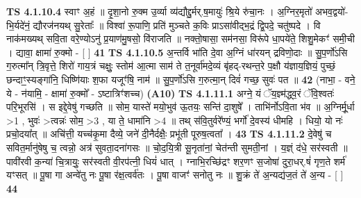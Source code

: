 \documentclass[17pt]{extarticle}
\begin{document}
                  \newline
                                \textbf{ TS 4.1.10.4} \newline
                  स्वाꣳ अ॒हं ॥ दृ॒शा॒नो रु॒क्म उ॒र्व्या व्य॑द्यौद्दु॒र्मर्.ष॒मायुः॑ श्रि॒ये रु॑चा॒नः । अ॒ग्निर॒मृतो॑ अभव॒द्वयो॑-भि॒र्यदे॑नं॒ द्यौरज॑नयथ् सु॒रेताः᳚ ॥ विश्वा॑ रू॒पाणि॒ प्रति॑ मुञ्चते क॒विः प्राऽसा॑वीद्भ॒द्रं द्वि॒पदे॒ चतु॑ष्पदे । वि नाक॑मख्यथ् सवि॒ता वरे॒ण्योऽनु॑ प्र॒याण॑मु॒षसो॒ वि॑राजति ॥ नक्तो॒षासा॒ सम॑नसा॒ विरू॑पे धा॒पये॑ते॒ शिशु॒मेकꣳ॑ समी॒ची । द्यावा॒ क्षामा॑ रु॒क्मो - [  ] \textbf{  41 } \newline
                  \newline
                                \textbf{ TS 4.1.10.5} \newline
                  अ॒न्तर्वि भा॑ति दे॒वा अ॒ग्निं धा॑रयन् द्रविणो॒दाः ॥ सु॒प॒र्णो॑ऽसि ग॒रुत्मा᳚न् त्रि॒वृत्ते॒ शिरो॑ गाय॒त्रं चक्षुः॒ स्तोम॑ आ॒त्मा साम॑ ते त॒नूर्वा॑मदे॒व्यं बृ॑हद्-रथन्त॒रे प॒क्षौ य॑ज्ञाय॒ज्ञियं॒ पुच्छं॒ छन्दाꣳ॒॒स्यङ्गा॑नि॒ धिष्णि॑याः श॒फा यजूꣳ॑षि॒ नाम॑ ॥ सु॒प॒र्णो॑ऽसि ग॒रुत्मा॒न् दिवं॑ गच्छ॒ सुवः॑ पत ॥ \textbf{  42} \newline
                  \newline
                      (नाभा॒ - वने॒ ये - न॑यामि॒ - क्षामा॑ रु॒क्मो᳚ - ऽष्टात्रिꣳ॑शच्च)  \textbf{(A10)} \newline \newline
                                        \textbf{ TS 4.1.11.1} \newline
                  अग्ने॒ यं ॅय॒ज्ञ्म॑द्ध्व॒रं ॅवि॒श्वतः॑ परि॒भूरसि॑ । स इद्दे॒वेषु॑ गच्छति ॥ सोम॒ यास्ते॑ मयो॒भुव॑ ऊ॒तयः॒ सन्ति॑ दा॒शुषे᳚ । ताभि॑र्नोऽवि॒ता भ॑व ॥ अ॒ग्निर्मू॒र्धा >1 , भुवः॑ >त्वन्नः॑ सोम॒ >3 , या ते॒ धामा॑नि >4 ॥ तथ् स॑वि॒तुर्वरे᳚ण्यं॒ भर्गो॑ दे॒वस्य॑ धीमहि । धियो॒ यो नः॑ प्रचो॒दया᳚त् ॥ अचि॑त्ती॒ यच्च॑कृ॒मा दैव्ये॒ जने॑ दी॒नैर्दक्षैः॒ प्रभू॑ती पूरुष॒त्वता᳚ । \textbf{  43} \newline
                  \newline
                                \textbf{ TS 4.1.11.2} \newline
                  दे॒वेषु॑ च सवित॒र्मानु॑षेषु च॒ त्वन्नो॒ अत्र॑ सुवता॒दना॑गसः ॥ चो॒द॒यि॒त्री सू॒नृता॑नां॒ चेत॑न्ती सुमती॒नां । य॒ज्ञ्ं द॑धे॒ सर॑स्वती ॥ पावी॑रवी क॒न्या॑ चि॒त्रायुः॒ सर॑स्वती वी॒रप॑त्नी॒ धियं॑ धात् । ग्नाभि॒रच्छि॑द्रꣳ शर॒णꣳ स॒जोषा॑ दुरा॒धर्.षं॑ गृण॒ते शर्म॑ यꣳसत् ॥ पू॒षा गा अन्वे॑तु नः पू॒षा र॑क्ष॒त्वर्व॑तः । पू॒षा वाजꣳ॑ सनोतु नः ॥ शु॒क्रं ते॑ अ॒न्यद्य॑ज॒तं ते॑ अ॒न्य - [  ] \textbf{  44} \newline
\end{document}
